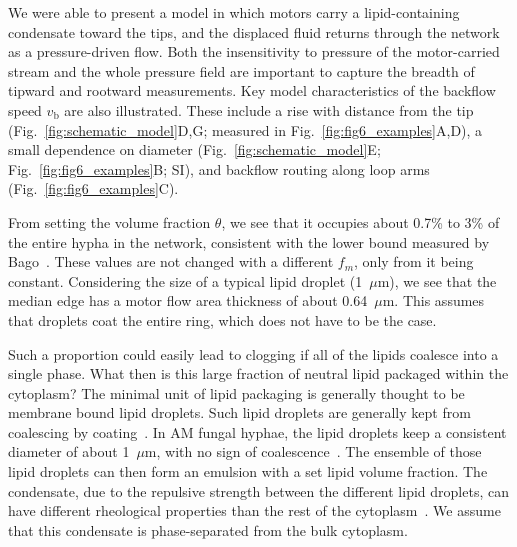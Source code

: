 We were able to present a model in which motors carry a lipid-containing condensate toward the tips, and the displaced fluid returns through the network as a pressure-driven flow.
Both the insensitivity to pressure of the motor-carried stream and the whole pressure field are important to capture the breadth of tipward and rootward measurements.
Key model characteristics of the backflow speed $v_\mathrm{b}$ are also illustrated. These include a rise with distance from the tip (Fig.~\ref{fig:schematic_model}D,G; measured in Fig.~\ref{fig:fig6_examples}A,D), a small dependence on diameter (Fig.~\ref{fig:schematic_model}E; Fig.~\ref{fig:fig6_examples}B; SI), and backflow routing along loop arms (Fig.~\ref{fig:fig6_examples}C).

From setting the volume fraction $\theta$, we see that it occupies about 0.7\% to 3\% of the entire hypha in the network, consistent with the lower bound measured by Bago~\cite{bago_translocation_2002}. These values are not changed with a different $f_m$, only from it being constant. Considering the size of a typical lipid droplet (1~$\mu$m), we see that the median edge has a motor flow area thickness of about 0.64~$\mu$m. This assumes that droplets coat the entire ring, which does not have to be the case.

Such a proportion could easily lead to clogging if all of the lipids coalesce into a single phase.
What then is this large fraction of neutral lipid packaged within the cytoplasm?
The minimal unit of lipid packaging is generally thought to be membrane bound lipid droplets.
Such lipid droplets are generally kept from coalescing by coating~\cite{thiam_why_2017}.
In AM fungal hyphae, the lipid droplets keep a consistent diameter of about 1~$\mu$m, with no sign of coalescence~\cite{sister_lipid_droplets_inprep}.
The ensemble of those lipid droplets can then form an emulsion with a set lipid volume fraction.
The condensate, due to the repulsive strength between the different lipid droplets, can have different rheological properties than the rest of the cytoplasm~\cite{jeffrey_rheological_1976}.
We assume that this condensate is phase-separated from the bulk cytoplasm.

